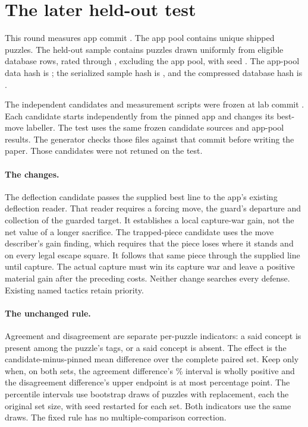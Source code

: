 \documentclass[11pt]{article}
\begin{document}
\appendix
\section{The later held-out test}

This round measures app commit \texttt{\RTwoAppCommitShort}. The app pool contains
\RTwoPuzzles{} unique shipped puzzles. The held-out sample contains
\RTwoSampled{} puzzles drawn uniformly from \RTwoEligible{} eligible database
rows, rated \RTwoRatingLow{} through \RTwoRatingHigh{}, excluding the app pool,
with seed \RTwoSeed. The app-pool data hash is \texttt{\RTwoPoolHash}; the
serialized sample hash is \texttt{\RTwoSampleHash}, and the compressed database
hash is \texttt{\RTwoDatabaseHash}.

The independent candidates and measurement scripts were frozen at lab commit
\texttt{\RTwoFrozenCommitShort}. Each candidate starts independently from the pinned
app and changes its best-move labeller. The test uses the same frozen candidate
sources and app-pool results. The generator checks those files against that
commit before writing the paper. Those candidates were not retuned on the test.

\paragraph{The changes.} The deflection candidate passes the supplied best line
to the app's existing deflection reader. That reader requires a forcing move,
the guard's departure and collection of the guarded target. It establishes a
local capture-war gain, not the net value of a longer sacrifice. The trapped-piece
candidate uses the move describer's gain finding, which requires that the piece
loses where it stands and on every legal escape square. It follows that same
piece through the supplied line until capture. The actual capture must win its
capture war and leave a positive material gain after the preceding costs.
Neither change searches every defense. Existing named tactics retain priority.

\paragraph{The unchanged rule.} Agreement and disagreement are separate
per-puzzle indicators: a said concept is present among the puzzle's tags, or a
said concept is absent. The effect is the candidate-minus-pinned mean difference
over the complete paired set. Keep only when, on both sets, the agreement
difference's \RTwoConfidence\% interval is wholly positive and the disagreement
difference's upper endpoint is at most \RTwoDisagreementLimit{} percentage
point. The percentile intervals use \RTwoDraws{} bootstrap draws of puzzles with
replacement, each the original set size, with seed \RTwoBootstrapSeed{}
restarted for each set. Both indicators use the same draws. The fixed rule has
no multiple-comparison correction.
\end{document}

